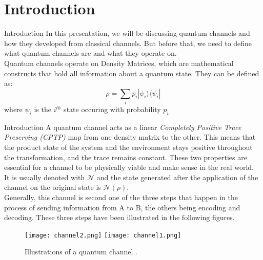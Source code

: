 \section{Introduction}

\begin{frame}{Introduction}
    In this presentation, we will be discussing quantum channels and how they developed from classical channels. But before that, we need to define what quantum channels
    are and what they operate on. \\
    Quantum channels operate on Density Matrices, which are mathematical constructs that hold all information about a quantum state. They can be defined as:
    \begin{equation}
        \rho = \sum_{i}p_i | \psi_i \rangle \langle \psi_i |   
    \end{equation}
    where $\psi_i$ is the $i^{th}$ state occuring with probability $p_i$
\end{frame}

\begin{frame}{Introduction}
    A quantum channel acts as a linear \textit{Completely Positive Trace Preserving (CPTP)} map from one density matrix to the other. This means that the product state
    of the system and the environment stays positive throughout the transformation, and the trace remains constant. These two properties are essential for a channel to
    be physically viable and make sense in the real world.\\
    It is usually denoted with $\mathcal{N}$ and the state generated after the application of the channel on the original state is $\mathcal{N} (\rho)$.\\
    Generally, this channel is second one of the three steps that happen in the process of sending information from A to B, the others being encoding and decoding.
    These three steps have been illustrated in the following figures.
\end{frame}

\begin{frame}
    \begin{figure}
        \texttt{[image: channel2.png]}
        \texttt{[image: channel1.png]}
        \caption{Illustrations of a quantum channel \cite{Gyongyosi_2018}.}
    \end{figure}
\end{frame}

